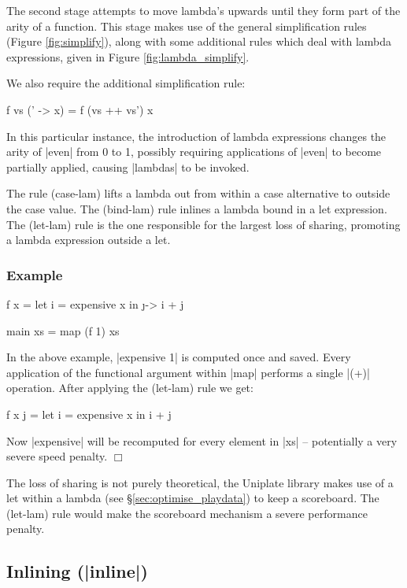 \documentclass[preprint]{sigplanconf}
\newcounter{exmp}
\newenvironment{exampleany}[1]
    {\subsubsection*{Example #1}}
    {\hfill$\Box$}
\newenvironment{example}
    {\refstepcounter{exmp}
     \begin{exampleany}{\arabic{exmp}}}
    {\end{exampleany}}
\begin{document}
The second stage attempts to move lambda's upwards until they form part of the arity of a function. This stage makes use of the general simplification rules (Figure \ref{fig:simplify}), along with some additional rules which deal with lambda expressions, given in Figure \ref{fig:lambda_simplify}.

We also require the additional simplification rule:

\begin{code}
f vs (\vs' -> x) = f (vs ++ vs') x
\end{code}

In this particular instance, the introduction of lambda expressions changes the arity of |even| from 0 to 1, possibly requiring applications of |even| to become partially applied, causing |lambdas| to be invoked.

The rule (case-lam) lifts a lambda out from within a case alternative to outside the case value. The (bind-lam) rule inlines a lambda bound in a let expression. The (let-lam) rule is the one responsible for the largest loss of sharing, promoting a lambda expression outside a let.

\begin{example}
\begin{code}
f x = let i = expensive x
      in \j -> i + j

main xs = map (f 1) xs
\end{code}

In the above example, |expensive 1| is computed once and saved. Every application of the functional argument within |map| performs a single |(+)| operation. After applying the (let-lam) rule we get:

\begin{code}
f x j = let i = expensive x
        in i + j
\end{code}

Now |expensive| will be recomputed for every element in |xs| -- potentially a very severe speed penalty.
\end{example}

The loss of sharing is not purely theoretical, the Uniplate library makes use of a let within a lambda (see \S\ref{sec:optimise_playdata}) to keep a scoreboard. The (let-lam) rule would make the scoreboard mechanism a severe performance penalty.

\subsection{Inlining (|inline|)}
\end{document}
